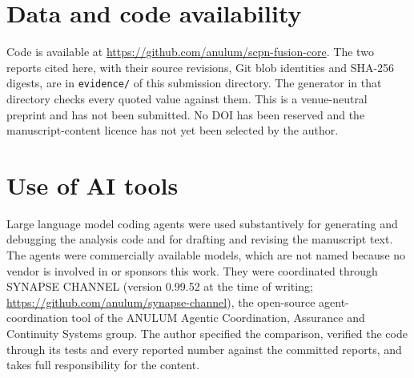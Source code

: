 \documentclass[11pt]{article}
\begin{document}
\section*{Data and code availability}

Code is available at \url{https://github.com/anulum/scpn-fusion-core}.  The
two reports cited here, with their source revisions, Git blob identities and
SHA-256 digests, are in \texttt{evidence/} of this submission directory.  The
generator in that directory checks every quoted value against them.  This is a
venue-neutral preprint and has not been submitted.  No DOI has been reserved
and the manuscript-content licence has not yet been selected by the author.

\section*{Use of AI tools}

Large language model coding agents were used substantively for generating and
debugging the analysis code and for drafting and revising the manuscript text.
The agents were commercially available models, which are not named because no
vendor is involved in or sponsors this work.  They were coordinated through
SYNAPSE CHANNEL (version 0.99.52 at the time of writing;
\url{https://github.com/anulum/synapse-channel}), the open-source
agent-coordination tool of the ANULUM Agentic Coordination, Assurance and
Continuity Systems group.  The author specified the comparison, verified the
code through its tests and every reported number against the committed
reports, and takes full responsibility for the content.


\end{document}
